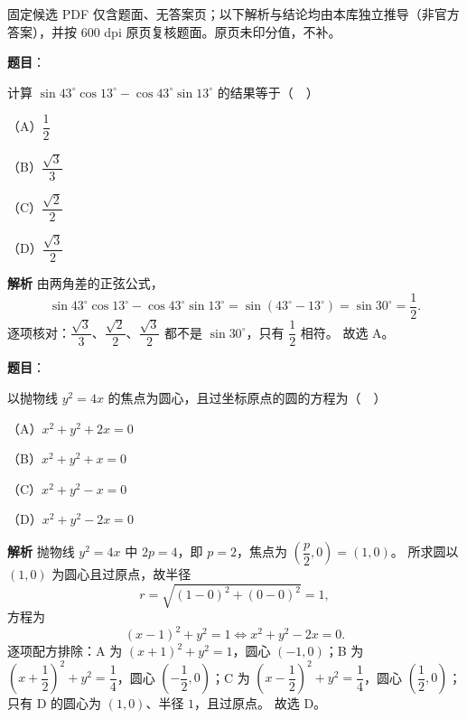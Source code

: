 \begin{gktip}
固定候选 PDF 仅含题面、无答案页；以下解析与结论均由本库独立推导（非官方答案），并按 600 dpi 原页复核题面。原页未印分值，不补。
\end{gktip}

\begin{answer}

\textbf{题目}：

计算 $\sin43^\circ\cos13^\circ-\cos43^\circ\sin13^\circ$ 的结果等于（　）

（A）$\dfrac12$

（B）$\dfrac{\sqrt3}{3}$

（C）$\dfrac{\sqrt2}{2}$

（D）$\dfrac{\sqrt3}{2}$

\textbf{解析}
由两角差的正弦公式，
\nopagebreak[4]
\[\sin43^\circ\cos13^\circ-\cos43^\circ\sin13^\circ=\sin(43^\circ-13^\circ)=\sin30^\circ=\frac12.\]
逐项核对：$\dfrac{\sqrt3}{3}$、$\dfrac{\sqrt2}{2}$、$\dfrac{\sqrt3}{2}$ 都不是 $\sin30^\circ$，只有 $\dfrac12$ 相符。
故选 A。


\end{answer}
\begin{answer}

\textbf{题目}：

以抛物线 $y^2=4x$ 的焦点为圆心，且过坐标原点的圆的方程为（　）

（A）$x^2+y^2+2x=0$

（B）$x^2+y^2+x=0$

（C）$x^2+y^2-x=0$

（D）$x^2+y^2-2x=0$

\textbf{解析}
抛物线 $y^2=4x$ 中 $2p=4$，即 $p=2$，焦点为 $\left(\dfrac p2,0\right)=(1,0)$。
所求圆以 $(1,0)$ 为圆心且过原点，故半径
\nopagebreak[4]
\[r=\sqrt{(1-0)^2+(0-0)^2}=1,\]
方程为
\nopagebreak[4]
\[(x-1)^2+y^2=1\iff x^2+y^2-2x=0.\]
逐项配方排除：A 为 $(x+1)^2+y^2=1$，圆心 $(-1,0)$；B 为 $\left(x+\dfrac12\right)^2+y^2=\dfrac14$，圆心 $\left(-\dfrac12,0\right)$；C 为 $\left(x-\dfrac12\right)^2+y^2=\dfrac14$，圆心 $\left(\dfrac12,0\right)$；只有 D 的圆心为 $(1,0)$、半径 $1$，且过原点。
故选 D。


\end{answer}

